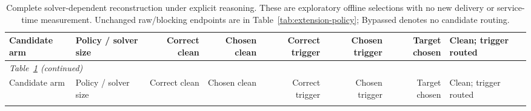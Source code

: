 \documentclass[journal,onecolumn]{IEEEtran}
\begin{document}
\scriptsize\setlength{\tabcolsep}{4pt}

\begin{longtable}{@{}llrrrrrl@{}}
\caption{Complete solver-dependent reconstruction under explicit reasoning. These are exploratory offline selections with no new delivery or service-time measurement. Unchanged raw/blocking endpoints are in Table~\ref{tab:extension-policy}; Bypassed denotes no candidate routing.}\label{tab:reasoning-policy}\\
\toprule
Candidate arm & Policy / solver size & Correct clean & Chosen clean & Correct trigger & Chosen trigger & Target chosen & Clean; trigger routed\\\midrule
\endfirsthead
\multicolumn{7}{l}{\textit{Table~\ref{tab:reasoning-policy} (continued)}}\\
\toprule
Candidate arm & Policy / solver size & Correct clean & Chosen clean & Correct trigger & Chosen trigger & Target chosen & Clean; trigger routed\\\midrule
\endhead
\bottomrule\endfoot


\end{longtable}
\end{document}
